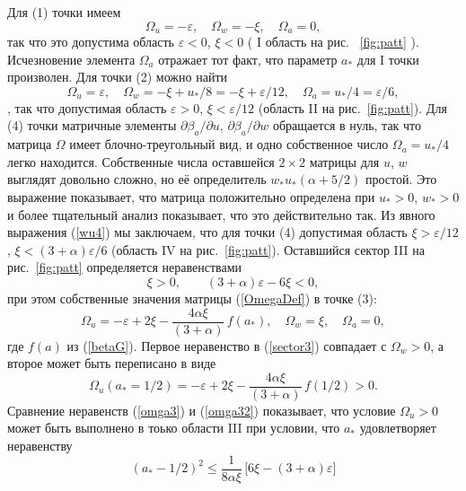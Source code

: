 \documentclass[a4paper,10pt]{article}
\begin{document}
Для (1) точки имеем \[ \Omega_{u} = -\varepsilon, \quad  \Omega_{w} = -\xi, \quad \Omega_{a} = 0, \]
 так что это допустима область $\varepsilon<0$, $\xi<0$ ( I область на рис. ~\ref{fig:patt} ).
Исчезновение элемента $\Omega_{a}$ отражает тот факт, что параметр $a_{*}$  для I точки произволен.
Для точки (2) можно найти  \[ \Omega_{u} = \varepsilon, \quad
\Omega_{w} = -\xi+u_{*}/8 = -\xi+\varepsilon/12,
\quad \Omega_{a} = u_{*}/4 = \varepsilon/6, \], так что  допустимая область $\varepsilon>0$, $\xi<\varepsilon/12$
(область II на рис.~\ref{fig:patt}).
Для (4) точки матричные  элементы $\partial\beta_{a}/\partial u$,
$\partial\beta_{a}/\partial w$   обращается в нуль,
так что матрица $\Omega$ имеет блочно-треугольный вид, и одно собственное число $\Omega_{a} = u_{*}/4$ легко находится.
Собственные числа оставшейся  $2\times2$  матрицы для $u$, $w$  выглядят довольно сложно, но её определитель  $w_{*}u_{*} (\alpha+5/2)$ простой.
Это выражение показывает, что матрица положительно определена при $u_{*}>0$, $w_{*}>0$ и более тщательный анализ показывает, что это действительно так.
Из явного выражения  (\ref{wu4}) мы заключаем, что для точки (4) допустимая область $\xi>\varepsilon/12$,
$\xi< (3+\alpha) \varepsilon/6$  (область IV на рис.~\ref{fig:patt}).
Оставшийся сектор  III на рис.~\ref{fig:patt} определяется неравенствами
\begin{equation}
\xi > 0, \qquad (3+\alpha) \varepsilon -6\xi<0,
\label{sector3}
\end{equation}
при этом собственные значения матрицы (\ref{OmegaDef}) в  точке (3):
\begin{equation}
\Omega_{u} =  -\varepsilon+2\xi- \frac{4\alpha\xi}{(3+\alpha)}\, f(a_{*}),
\quad \Omega_{w} = \xi, \quad \Omega_{a} = 0,
\label{omga3}
\end{equation}
где $f(a)$ из (\ref{betaG}).
Первое неравенство в (\ref{sector3}) совпадает с $\Omega_{w}>0$, а второе
может быть переписано в виде
\begin{equation}
\Omega_{u}({a_{*}=1/2}) = -\varepsilon+2\xi-
\frac{4\alpha\xi}{(3+\alpha)}\, f(1/2) >0.
\label{omga32}
\end{equation}
Сравнение неравенств (\ref{omga3}) и (\ref{omga32}) показывает, что условие
 $\Omega_{u}>0$  может быть выполнено в тоько области III при условии, что
 $a_{*}$  удовлетворяет неравенству
\begin{equation}
(a_{*}-1/2)^{2} \le \frac{1}{8\alpha\xi}\,
\bigl[ 6\xi- (3+\alpha)\varepsilon \bigr]
\label{kut}
\end{equation}
\end{document}

